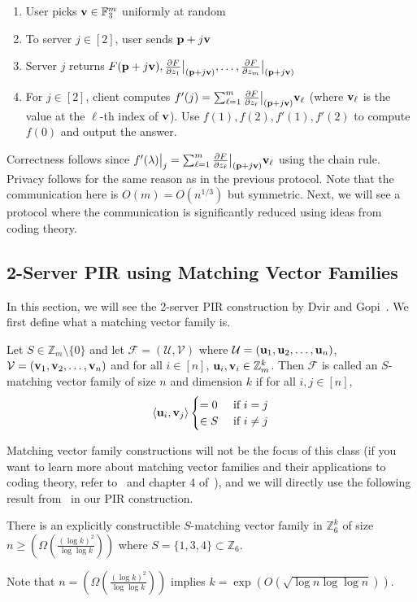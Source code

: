 \begin{enumerate}
    \item User picks $\mathbf{v}\in \mathbb{F}_3^m$ uniformly at random
    \item To server $j\in [2]$, user sends $\mathbf{p}+j\mathbf{v}$
    \item Server $j$ returns $F(\mathbf{p}+j\mathbf{v}),\frac{\partial F}{\partial z_1}\big|_{(\mathbf{p}+j\mathbf{v})},\ldots, \frac{\partial F}{\partial z_m}\big|_{(\mathbf{p}+j\mathbf{v})}$
    \item For $j\in [2]$, client computes $f'(j)=\sum_{\ell=1}^m\frac{\partial F}{\partial z_\ell}\big|_{(\mathbf{p}+j\mathbf{v})}\mathbf{v}_\ell$ (where $\mathbf{v}_\ell$ is the value at the $\ell$-th index of $\mathbf{v}$). Use $f(1),f(2),f'(1),f'(2)$ to compute $f(0)$ and output the answer.
\end{enumerate}
Correctness follows since $f'(\lambda)\big|_j=\sum_{\ell=1}^m\frac{\partial F}{\partial z_\ell}\big|_{(\mathbf{p}+j\mathbf{v})}\mathbf{v}_\ell$ using the chain rule. Privacy follows for the same reason as in the previous protocol. Note that the communication here is $O(m)=O(n^{1/3})$ but symmetric. Next, we will see a protocol where the communication is significantly reduced using ideas from coding theory.
\subsection{2-Server PIR using Matching Vector Families}
In this section, we will see the 2-server PIR construction by Dvir and Gopi~\cite{dvir20162}.
We first define what a matching vector family is.
\begin{definition}
    Let $S\in \mathbb{Z}_m\setminus \{0\}$ and let $\mathcal{F}=(\mathcal{U},\mathcal{V})$ where $\mathcal{U}=(\mathbf{u}_1,\mathbf{u}_2,\ldots,\mathbf{u}_n)$, $\mathcal{V}=(\mathbf{v}_1,\mathbf{v}_2,\ldots,\mathbf{v}_n)$ and for all $i\in [n]$, $\mathbf{u}_i,\mathbf{v}_i\in \mathbb{Z}_m^k$. Then $\mathcal{F}$ is called an $S$-matching vector family of size $n$ and dimension $k$ if for all $i,j\in[n]$,
    \[
    \langle \mathbf{u}_i,\mathbf{v}_j\rangle\begin{cases}
        =0 &\text{ if }i=j\\
        \in S&\text{ if }i\ne j
    \end{cases}
    \]
\end{definition}
Matching vector family constructions will not be the focus of this class (if you want to learn more about matching vector families and their applications to coding theory, refer to~\cite{dvir2011matching} and chapter 4 of~\cite{Yek}), and we will directly use the following result from~\cite{Gro} in our PIR construction.
\begin{proposition}
    There is an explicitly constructible $S$-matching vector family in $\mathbb{Z}_6^k$ of size $n\ge \left(\Omega\left(\frac{(\log k)^2}{\log\log k}\right)\right)$ where $S=\{1,3,4\}\subset \mathbb{Z}_6$.
\end{proposition}
Note that $n= \left(\Omega\left(\frac{(\log k)^2}{\log\log k}\right)\right)$ implies $k=\exp(O(\sqrt{\log n \log\log n}))$. 

